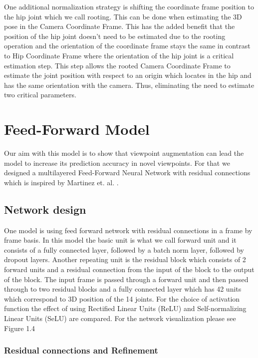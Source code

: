 One additional normalization strategy is shifting the coordinate frame position to the hip joint which we call rooting. This can be done when estimating the 3D pose in the Camera Coordinate Frame. This has the added benefit that the position of the hip joint doesn't need to be estimated due to the rooting operation and the orientation of the coordinate frame stays the same in contrast to Hip Coordinate Frame where the orientation of the hip joint is a critical estimation step. This step allows the rooted Camera Coordinate Frame to estimate the joint position with respect to an origin which locates in the hip and has the same orientation with the camera. Thus, eliminating the need to estimate two critical parameters.

\section{Feed-Forward Model}

Our aim with this model is to show that viewpoint augmentation can lead the model to increase its prediction accuracy in novel viewpoints. For that we designed a multilayered Feed-Forward Neural Network with residual connections \parencite{he2016deep} which is inspired by Martinez et. al. \parencite{martinez2017simple}.

\subsection{Network design}

One model is using feed forward network with residual connections in a frame by frame basis. In this model the basic unit is what we call forward unit and it consists of a fully connected layer, followed by a batch norm layer, followed by dropout layers. Another repeating unit is the residual block which consists of 2 forward units and a residual connection from the input of the block to the output of the block. The input frame is passed through a forward unit and then passed through to two residual blocks and a fully connected layer which has 42 units which correspond to 3D position of the 14 joints. For the choice of activation function the effect of using Rectified Linear Units (ReLU) \parencite{nair2010rectified} and Self-normalizing Linear Units (SeLU) \parencite{klambauer2017self} are compared. For the network visualization please see Figure 1.4

\subsubsection{Residual connections and Refinement}

